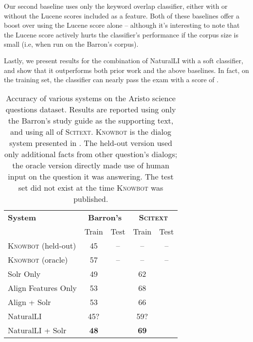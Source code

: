 Our second baseline uses only the keyword overlap classifier, either with or without
  the Lucene scores included as a feature.
Both of these baselines offer a boost over using the Lucene score alone -- although
  it's interesting to note that the Lucene score actively hurts the classifier's
  performance if the corpus size is small (i.e, when run on the Barron's corpus).

Lastly, we present results for the combination of NaturalLI with a soft classifier,
  and show that it outperforms both prior work and the above baselines.
In fact, on the training set, the classifier can nearly pass the exam with a score
  of .

%
%
\def\t#1{\small{#1}}
\def\b#1{\t{\textbf{#1}}}
\def\colspaceS{2.0mm}
\def\colspaceM{3.0mm}
\def\colspaceL{4.0mm}

\begin{table}
\begin{center}
\begin{tabular}{l@{\hskip \colspaceL}c@{\hskip \colspaceS}c@{\hskip \colspaceL}c@{\hskip \colspaceS}c}
\hline
\textbf{System} & \multicolumn{2}{c}{\textbf{Barron's}} & \multicolumn{2}{c}{\textbf{\textsc{Scitext}}} \\
 & Train & Test & Train & Test \\
\hline
\t{\textsc{Knowbot} (held-out)} & \t{45} & \t{--} & \t{--} & \t{--} \\
\t{\textsc{Knowbot} (oracle)}   & \t{57} & \t{--} & \t{--} & \t{--} \\
\hline                                                         
\t{Solr Only}                   & \t{49} & \t{  } & \t{62} & \t{ } \\
\t{Align Features Only}         & \t{53} & \t{  } & \t{68} & \t{ } \\
\t{Align + Solr}                & \t{53} & \t{  } & \t{66} & \t{ } \\
\t{NaturalLI}                   & \t{45?} & \t{  } & \t{59?} & \t{ } \\
\t{NaturalLI + Solr}            & \b{48} & \b{  } & \b{69} & \b{ } \\
\hline
\end{tabular}
\end{center}
\caption{
\label{tab:aristonaturalli}
Accuracy of various systems on the Aristo science questions dataset.
Results are reported using only the Barron's study guide as the supporting
  text, and using all of \textsc{Scitext}.
\textsc{Knowbot} is the dialog system presented in .
The held-out version used only additional facts from other question's dialogs;
  the oracle version directly made use of human input on the question it was 
  answering.
The test set did not exist at the time \textsc{Knowbot} was published.
}
\end{table}
%
%

